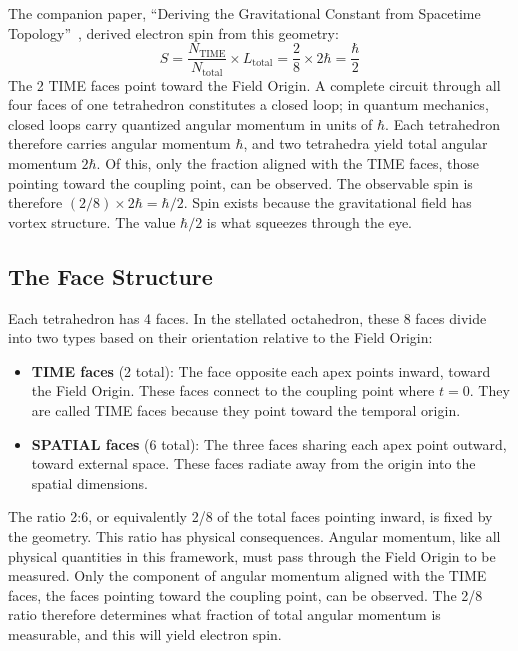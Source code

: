 \documentclass[aps,prd,preprint,superscriptaddress,showpacs,preprintnumbers,amsmath,amssymb,nofootinbib]{revtex4-2}
\begin{document}
The companion paper, ``Deriving the Gravitational Constant from Spacetime Topology''~\cite{paper6}, derived electron spin from this geometry:
\begin{equation}
S = \frac{N_{\text{TIME}}}{N_{\text{total}}} \times L_{\text{total}} = \frac{2}{8} \times 2\hbar = \frac{\hbar}{2}
\label{eq:spin}
\end{equation}
The 2 TIME faces point toward the Field Origin. A complete circuit through all four faces of one tetrahedron constitutes a closed loop; in quantum mechanics, closed loops carry quantized angular momentum in units of $\hbar$. Each tetrahedron therefore carries angular momentum $\hbar$, and two tetrahedra yield total angular momentum $2\hbar$. Of this, only the fraction aligned with the TIME faces, those pointing toward the coupling point, can be observed. The observable spin is therefore $(2/8) \times 2\hbar = \hbar/2$. Spin exists because the gravitational field has vortex structure. The value $\hbar/2$ is what squeezes through the eye.

\subsection{The Face Structure}
\label{subsec:faces}

Each tetrahedron has 4 faces. In the stellated octahedron, these 8 faces divide into two types based on their orientation relative to the Field Origin:

\begin{itemize}
\item \textbf{TIME faces} (2 total): The face opposite each apex points inward, toward the Field Origin. These faces connect to the coupling point where $t = 0$. They are called TIME faces because they point toward the temporal origin.
\item \textbf{SPATIAL faces} (6 total): The three faces sharing each apex point outward, toward external space. These faces radiate away from the origin into the spatial dimensions.
\end{itemize}

The ratio 2:6, or equivalently 2/8 of the total faces pointing inward, is fixed by the geometry. This ratio has physical consequences. Angular momentum, like all physical quantities in this framework, must pass through the Field Origin to be measured. Only the component of angular momentum aligned with the TIME faces, the faces pointing toward the coupling point, can be observed. The 2/8 ratio therefore determines what fraction of total angular momentum is measurable, and this will yield electron spin.
\end{document}
